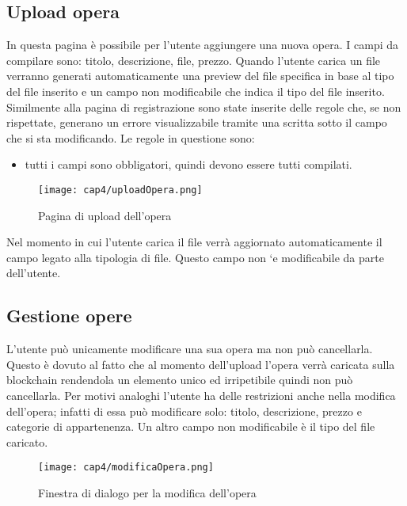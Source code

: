 \subsection{Upload opera}
\label{subsec:upload-opera}

In questa pagina è possibile per l'utente aggiungere una nuova opera. I campi da compilare sono: titolo, descrizione, file, prezzo. Quando l'utente carica un file verranno generati automaticamente una preview del file specifica in base al tipo del file inserito e un campo non modificabile che indica il tipo del file inserito. Similmente alla pagina di registrazione sono state inserite delle regole che, se non rispettate, generano un errore visualizzabile tramite una scritta sotto il campo che si sta modificando. Le regole in questione sono:
\begin{itemize}
	\item tutti i campi sono obbligatori, quindi devono essere tutti compilati.
\end{itemize}
\begin{figure}[H]
	\begin{center}
		\texttt{[image: cap4/uploadOpera.png]}
		\caption{Pagina di upload dell'opera}
	\end{center}
\end{figure}
Nel momento in cui l’utente carica il file verrà aggiornato automaticamente il campo legato alla tipologia di file.
Questo campo non `e modificabile da parte dell'utente.
\subsection{Gestione opere}
\label{subsec:gestione-opere}

L'utente può unicamente modificare una sua opera ma non può cancellarla. Questo è dovuto al fatto che al momento dell'upload l'opera verrà caricata sulla blockchain rendendola un elemento unico ed irripetibile quindi non può cancellarla. Per motivi analoghi l'utente ha delle restrizioni anche nella modifica dell'opera; infatti di essa può modificare solo: titolo, descrizione, prezzo e categorie di appartenenza. Un altro campo non modificabile è il tipo del file caricato.
\begin{figure}[H]
	\begin{center}
		\texttt{[image: cap4/modificaOpera.png]}
		\caption{Finestra di dialogo per la modifica dell'opera}
	\end{center}
\end{figure}

